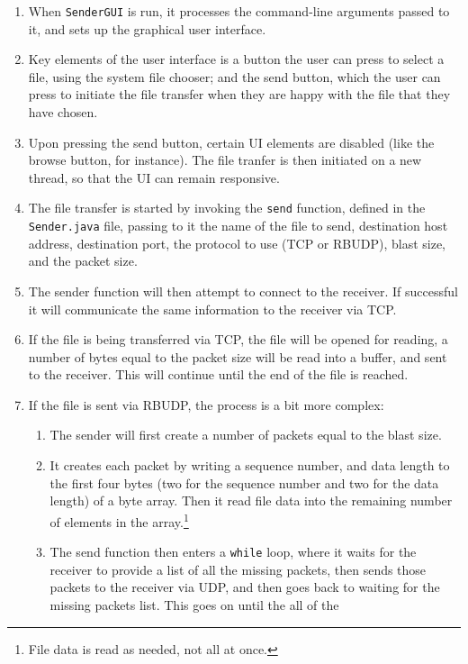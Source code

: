 \documentclass[10pt, a4paper]{article}
\begin{document}
\begin{enumerate}
  \item When \texttt{SenderGUI} is run, it processes the command-line arguments
    passed to it, and sets up the graphical user interface.
  \item Key elements of the user interface is a button the user can press to
    select a file, using the system file chooser; and the send button, which the
    user can press to initiate the file transfer when they are happy with the
    file that they have chosen.
  \item Upon pressing the send button, certain UI elements are disabled (like
    the browse button, for instance). The file tranfer is then initiated on a
    new thread, so that the UI can remain responsive.
  \item The file transfer is started by invoking the \texttt{send} function,
    defined in the \texttt{Sender.java} file, passing to it the name of the file
    to send, destination host address, destination port, the protocol to use
    (TCP or RBUDP), blast size, and the packet size.
  \item The sender function will then attempt to connect to the receiver. If
    successful it will communicate the same information to the receiver via TCP.
  \item If the file is being transferred via TCP, the file will be opened for
    reading, a number of bytes equal to the packet size will be read into a
    buffer, and sent to the receiver. This will continue until the end of the
    file is reached.
  \item If the file is sent via RBUDP, the process is a bit more complex:
    \begin{enumerate}
      \item The sender will first create a number of packets equal to the blast
        size.
      \item It creates each packet by writing a sequence number, and data
        length to the first four bytes (two for the sequence number and two for
        the data length) of a byte array. Then it read file data into the
        remaining number of elements in the array.\footnote{File data is read
        as needed, not all at once.}
      \item The send function then enters a \texttt{while} loop, where it waits
        for the receiver to provide a list of all the missing packets, then
        sends those packets to the receiver via UDP, and then goes back to
        waiting for the missing packets list. This goes on until the all of the

\end{enumerate}
\end{enumerate}
\end{document}
